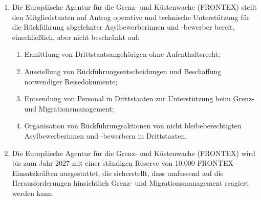 \documentclass[12pt,a4paper]{article}
\begin{document}
\begin{enumerate}[leftmargin=2em, itemsep=6pt]
  \item Die Europäische Agentur für die Grenz- und Küstenwache (FRONTEX) stellt den Mitgliedstaaten auf Antrag operative und technische Unterstützung für die Rückführung abgelehnter Asylbewerberinnen und -bewerber bereit, einschließlich, aber nicht beschränkt auf:
  \begin{enumerate}[label=(\alph*), leftmargin=1.8em, itemsep=4pt]
    \item Ermittlung von Drittstaatsangehörigen ohne Aufenthaltsrecht;
    \item Ausstellung von Rückführungsentscheidungen und Beschaffung notwendiger Reisedokumente;
    \newline
    \item Entsendung von Personal in Drittstaaten zur Unterstützung beim Grenz- und Migrationsmanagement;
    \item Organisation von Rückführungsaktionen von nicht bleibeberechtigten Asylbewerberinnen und -bewerbern in Drittstaaten.
  \end{enumerate}
  \item Die Europäische Agentur für die Grenz- und Küstenwache (FRONTEX) wird bis zum Jahr 2027 mit einer ständigen Reserve von 10.000 FRONTEX-Einsatzkräften ausgestattet, die sicherstellt, dass umfassend auf die Herausforderungen hinsichtlich Grenz- und Migrationsmanagement reagiert werden kann.
\end{enumerate}
\end{document}
